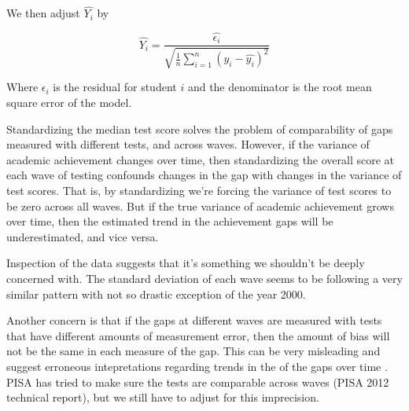 \documentclass[11pt, a4paper]{article}\usepackage[]{graphicx}\usepackage[]{color}
\begin{document}
We then adjust \begin{math} \hat{Y_i} \end{math} by

\begin{equation}
\hat{Y_i} = \frac{\hat{\epsilon_i}}{\sqrt{\frac{1}{n} \sum_{i=1}^{n} (y_i - \hat{y_i})^2}}
\end{equation}


Where \begin{math}\epsilon_i\end{math} is the residual for student \begin{math}i\end{math} and the denominator is the root mean square error of the model.


Standardizing the median test score solves the problem of comparability of gaps measured with different tests, and across waves. However, if the variance of academic achievement changes over time, then standardizing the overall score at each wave of testing confounds changes in the gap with changes in the variance of test scores. That is, by standardizing we're forcing the variance of test scores to be zero across all waves. But if the true variance of academic achievement grows over time, then the estimated trend in the achievement gaps will be underestimated, and vice versa.



Inspection of the data suggests that it's something we shouldn't be deeply concerned with. The standard deviation of each wave seems to be following a very similar pattern with not so drastic exception of the year 2000.

Another concern is that if the gaps at different waves are measured with tests that have different amounts of measurement error, then the amount of bias will not be the same in each measure of the gap. This can be very misleading and suggest erroneous intepretations regarding trends in the of the gaps over time \citep{reardon2011}. PISA has tried to make sure the tests are comparable across waves (PISA 2012 technical report), but we still have to adjust for this imprecision.
\end{document}

